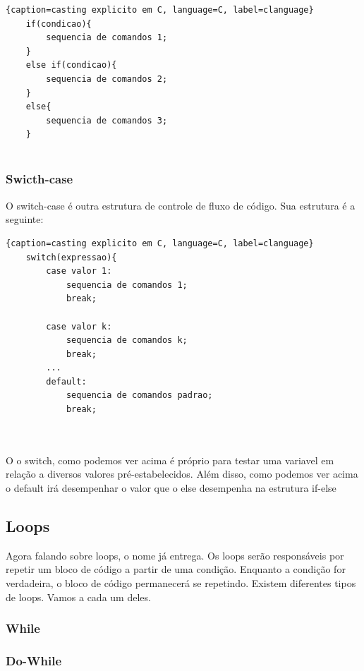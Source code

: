 \documentclass{report}
\begin{document}
	\begin{center}
		
		\begin{lstlisting}{caption=casting explicito em C, language=C, label=clanguage}
	if(condicao){
		sequencia de comandos 1;
	}
	else if(condicao){
		sequencia de comandos 2;
	}
	else{
		sequencia de comandos 3;
	}
			
		\end{lstlisting}
	\end{center}
	
	\subsubsection{Swicth-case}
	O switch-case é outra estrutura de controle de fluxo de código. Sua estrutura é a seguinte:
	
	\begin{center}
		
		\begin{lstlisting}{caption=casting explicito em C, language=C, label=clanguage}
	switch(expressao){
		case valor 1:
			sequencia de comandos 1;
			break;
		
		case valor k:
			sequencia de comandos k;
			break;
		...
		default:
			sequencia de comandos padrao;
			break;
		
			
		\end{lstlisting}
	\end{center}
	
	O o switch, como podemos ver acima é próprio para testar uma variavel em relação a diversos valores pré-estabelecidos. Além disso, como podemos ver acima o default irá desempenhar o valor que o else desempenha na estrutura if-else
	\subsection{Loops}
	Agora falando sobre loops, o nome já entrega. Os loops serão responsáveis por repetir um bloco de código a partir de uma condição. Enquanto a condição for verdadeira, o bloco de código permanecerá se repetindo. Existem diferentes tipos de loops. Vamos a cada um deles.
	
	\subsubsection{While}
	\subsubsection{Do-While}
\end{document}
